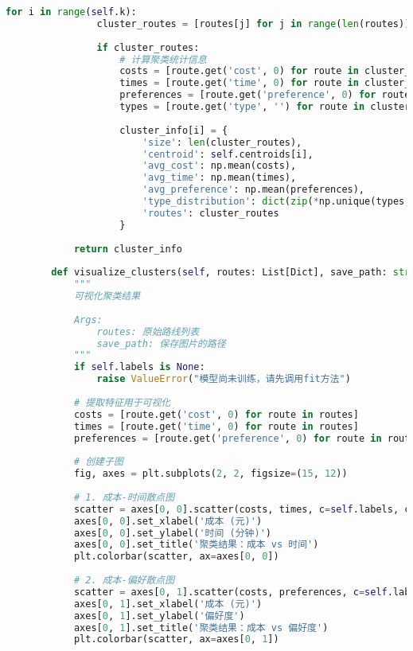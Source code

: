 \begin{lstlisting}[language=Python]
            for i in range(self.k):
                cluster_routes = [routes[j] for j in range(len(routes)) if self.labels[j] == i]
                
                if cluster_routes:
                    # 计算聚类统计信息
                    costs = [route.get('cost', 0) for route in cluster_routes]
                    times = [route.get('time', 0) for route in cluster_routes]
                    preferences = [route.get('preference', 0) for route in cluster_routes]
                    types = [route.get('type', '') for route in cluster_routes]
                    
                    cluster_info[i] = {
                        'size': len(cluster_routes),
                        'centroid': self.centroids[i],
                        'avg_cost': np.mean(costs),
                        'avg_time': np.mean(times),
                        'avg_preference': np.mean(preferences),
                        'type_distribution': dict(zip(*np.unique(types, return_counts=True))),
                        'routes': cluster_routes
                    }
            
            return cluster_info
        
        def visualize_clusters(self, routes: List[Dict], save_path: str = None):
            """
            可视化聚类结果
            
            Args:
                routes: 原始路线列表
                save_path: 保存图片的路径
            """
            if self.labels is None:
                raise ValueError("模型尚未训练，请先调用fit方法")
            
            # 提取特征用于可视化
            costs = [route.get('cost', 0) for route in routes]
            times = [route.get('time', 0) for route in routes]
            preferences = [route.get('preference', 0) for route in routes]
            
            # 创建子图
            fig, axes = plt.subplots(2, 2, figsize=(15, 12))
            
            # 1. 成本-时间散点图
            scatter = axes[0, 0].scatter(costs, times, c=self.labels, cmap='viridis', alpha=0.7)
            axes[0, 0].set_xlabel('成本 (元)')
            axes[0, 0].set_ylabel('时间 (分钟)')
            axes[0, 0].set_title('聚类结果：成本 vs 时间')
            plt.colorbar(scatter, ax=axes[0, 0])
            
            # 2. 成本-偏好散点图
            scatter = axes[0, 1].scatter(costs, preferences, c=self.labels, cmap='viridis', alpha=0.7)
            axes[0, 1].set_xlabel('成本 (元)')
            axes[0, 1].set_ylabel('偏好度')
            axes[0, 1].set_title('聚类结果：成本 vs 偏好度')
            plt.colorbar(scatter, ax=axes[0, 1])
            

\end{lstlisting}
